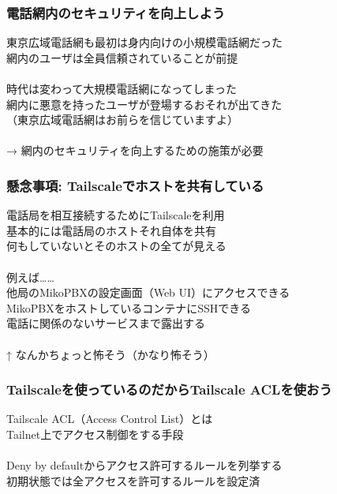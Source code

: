 \documentclass[
  lualatex,
  aspectratio=169,
  14pt
]{beamer}
\begin{document}
\begin{frame}
  \frametitle{電話網内のセキュリティを向上しよう}

  東京広域電話網も最初は身内向けの小規模電話網だった\\
  \hspace{1.5\zw}網内のユーザは全員信頼されていることが前提
  \\~\\[-.5\baselineskip]

  時代は変わって大規模電話網になってしまった\\
  \hspace{1.5\zw}網内に悪意を持ったユーザが登場するおそれが出てきた\\
  \hspace{1.5\zw}（東京広域電話網はお前らを信じていますよ）
  \\~\\[-.5\baselineskip]

  → 網内のセキュリティを向上するための施策が必要

  \note{ }
\end{frame}

\begin{frame}
  \frametitle{懸念事項: Tailscaleでホストを共有している}

  電話局を相互接続するためにTailscaleを利用\\
  \hspace{1.5\zw}基本的には電話局のホストそれ自体を共有\\
  \hspace{1.5\zw}何もしていないとそのホストの全てが見える
  \\~\\[-.5\baselineskip]

  例えば……\\
  \hspace{1.5\zw}他局のMikoPBXの設定画面（Web UI）にアクセスできる\\
  \hspace{1.5\zw}MikoPBXをホストしているコンテナにSSHできる\\
  \hspace{1.5\zw}電話に関係のないサービスまで露出する
  \\~\\[-.5\baselineskip]

  \hfill ↑ なんかちょっと怖そう（かなり怖そう）

  \note{ }
\end{frame}

\begin{frame}
  \frametitle{Tailscaleを使っているのだからTailscale ACLを使おう}

  Tailscale ACL（Access Control List）とは\\
  \hspace{1.5\zw}Tailnet上でアクセス制御をする手段
  \\~\\[-.5\baselineskip]

  Deny by defaultからアクセス許可するルールを列挙する\\
  \hspace{1.5\zw}初期状態では全アクセスを許可するルールを設定済

  \note{ }
\end{frame}
\end{document}
